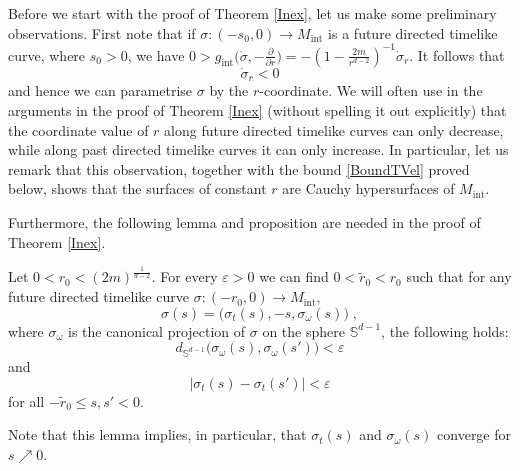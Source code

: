 \documentclass[reqno]{article}
\newcommand{\Sd}{\mathbb{S}^{d-1}}
\newcommand{\Mint}{M_{\mathrm{int}}}
\newcommand{\gint}{g_{\mathrm{int}}}
\begin{document}
Before we start with the proof of Theorem \ref{Inex}, let us make some preliminary observations.
First note that if $\sigma : (-s_0, 0) \to \Mint$ is a future directed timelike curve, where $s_0 >0$, we have  $0 > \gint\big(\dot{\sigma}, -\frac{\partial}{\partial r}\big) = -(1 -\frac{2m}{r^{d-2}})^{-1} \dot{\sigma}_r $. It follows that 
\begin{equation}
\label{RVel}
\dot{\sigma}_r <0
\end{equation}
and hence we can parametrise $\sigma$ by the $r$-coordinate. We will often use in the arguments in the proof of Theorem \ref{Inex} (without spelling it out explicitly) that the coordinate value of $r$ along future directed timelike curves can only decrease, while along past directed timelike curves it can only increase. In particular, let us remark that this observation, together with the bound \eqref{BoundTVel} proved below, shows that the surfaces of constant $r$ are Cauchy hypersurfaces of $\Mint$.

Furthermore, the following lemma and proposition are needed in the proof of Theorem \ref{Inex}.

\begin{lemma}
\label{BoundsOnReach}
Let $0<r_0< (2m)^{\frac{1}{d-2}}$. For every $\varepsilon >0$ we can find $0<\tilde{r}_0 < r_0 $ such that for any future directed timelike curve $\sigma : (-r_0,0) \to \Mint$,
\begin{equation*}
\sigma(s) = \big(\sigma_t(s), -s, \sigma_{\omega}(s)\big) \;,
\end{equation*}
where $\sigma_{\omega}$ is the canonical projection of $\sigma$ on the sphere $\Sd$, the following holds:
\begin{equation*}
d_{\Sd}\big(\sigma_{\omega}(s), \sigma_{\omega}(s') \big) < \varepsilon     
\end{equation*}
and
\begin{equation*}
|\sigma_t(s) - \sigma_t(s')| < \varepsilon
\end{equation*}
for all  $-\tilde{r}_0 \leq s,s' <0$.
\end{lemma}
Note that this lemma implies, in particular, that $\sigma_t(s)$ and $\sigma_\omega(s)$ converge for $s \nearrow 0$.
\end{document}

